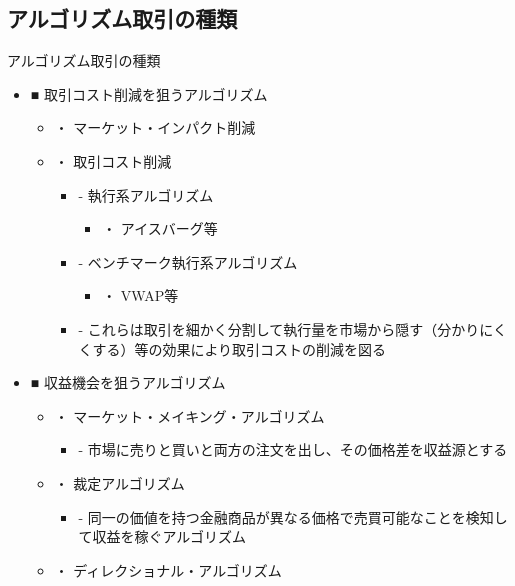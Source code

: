 \documentclass[dvipdfmx, autodetect-engine, aspectratio=169, 10.5pt]{beamer}
\begin{document}
\subsection{アルゴリズム取引の種類}
\begin{frame}{アルゴリズム取引の種類}
	\scriptsize
	\begin{itemize}
		\item ■ 取引コスト削減を狙うアルゴリズム
		      \begin{itemize}
			      \item ・ マーケット・インパクト削減
			      \item ・ 取引コスト削減
			            \begin{itemize}
				            \item - 執行系アルゴリズム
				                  \begin{itemize}
					                  \item ・ アイスバーグ等
				                  \end{itemize}
				            \item - ベンチマーク執行系アルゴリズム
				                  \begin{itemize}
					                  \item ・ VWAP等
				                  \end{itemize}
				            \item - これらは取引を細かく分割して執行量を市場から隠す（分かりにくくする）等の効果により取引コストの削減を図る
			            \end{itemize}
		      \end{itemize}
		\item ■ 収益機会を狙うアルゴリズム
		      \begin{itemize}
			      \item ・ マーケット・メイキング・アルゴリズム
			            \begin{itemize}
				            \item - 市場に売りと買いと両方の注文を出し、その価格差を収益源とする
			            \end{itemize}
			      \item ・ 裁定アルゴリズム
			            \begin{itemize}
				            \item - 同一の価値を持つ金融商品が異なる価格で売買可能なことを検知して収益を稼ぐアルゴリズム
			            \end{itemize}
			      \item ・ ディレクショナル・アルゴリズム

\end{itemize}
\end{itemize}
\end{frame}
\end{document}
